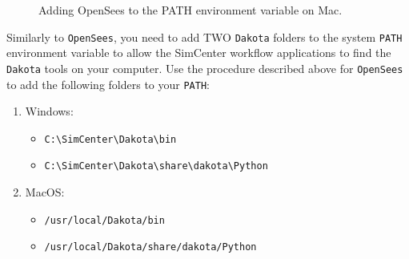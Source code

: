 \begin{figure}[!htbp]
  \caption{Adding OpenSees to the PATH environment variable on Mac.}
  \label{fig:dakota_installation}
\end{figure}

Similarly to \texttt{OpenSees}, you need to add TWO \texttt{Dakota} folders to the
system \texttt{PATH} environment variable to allow the SimCenter
workflow applications to find the \texttt{Dakota} tools on your computer. Use
the procedure described above for \texttt{OpenSees} to add the following
folders to your \texttt{PATH}:

\begin{enumerate}
\item Windows:
\begin{itemize}
    \item \texttt{C:\textbackslash SimCenter\textbackslash Dakota\textbackslash bin}
    \item \texttt{C:\textbackslash SimCenter\textbackslash Dakota\textbackslash share\textbackslash dakota\textbackslash Python}
\end{itemize}

\item MacOS:
\begin{itemize}
    \item \texttt{/usr/local/Dakota/bin}
    \item \texttt{/usr/local/Dakota/share/dakota/Python}
\end{itemize}
\end{enumerate}
